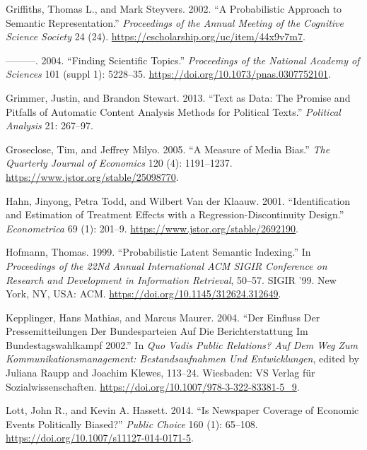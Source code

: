 \documentclass[
]{article}
\begin{document}
\leavevmode\hypertarget{ref-griffiths_probabilistic_2002}{}%
Griffiths, Thomas L., and Mark Steyvers. 2002. ``A Probabilistic
Approach to Semantic Representation.'' \emph{Proceedings of the Annual
Meeting of the Cognitive Science Society} 24 (24).
\url{https://escholarship.org/uc/item/44x9v7m7}.

\leavevmode\hypertarget{ref-griffiths_finding_2004}{}%
---------. 2004. ``Finding Scientific Topics.'' \emph{Proceedings of the
National Academy of Sciences} 101 (suppl 1): 5228--35.
\url{https://doi.org/10.1073/pnas.0307752101}.

\leavevmode\hypertarget{ref-grimmer_text_2013}{}%
Grimmer, Justin, and Brandon Stewart. 2013. ``Text as Data: The Promise
and Pitfalls of Automatic Content Analysis Methods for Political
Texts.'' \emph{Political Analysis} 21: 267--97.

\leavevmode\hypertarget{ref-groseclose_measure_2005}{}%
Groseclose, Tim, and Jeffrey Milyo. 2005. ``A Measure of Media Bias.''
\emph{The Quarterly Journal of Economics} 120 (4): 1191--1237.
\url{https://www.jstor.org/stable/25098770}.

\leavevmode\hypertarget{ref-hahn_identification_2001}{}%
Hahn, Jinyong, Petra Todd, and Wilbert Van der Klaauw. 2001.
``Identification and Estimation of Treatment Effects with a
Regression-Discontinuity Design.'' \emph{Econometrica} 69 (1): 201--9.
\url{https://www.jstor.org/stable/2692190}.

\leavevmode\hypertarget{ref-hofmann_probabilistic_1999}{}%
Hofmann, Thomas. 1999. ``Probabilistic Latent Semantic Indexing.'' In
\emph{Proceedings of the 22Nd Annual International ACM SIGIR Conference
on Research and Development in Information Retrieval}, 50--57. SIGIR
'99. New York, NY, USA: ACM.
\url{https://doi.org/10.1145/312624.312649}.

\leavevmode\hypertarget{ref-kepplinger_einfluss_2004}{}%
Kepplinger, Hans Mathias, and Marcus Maurer. 2004. ``Der Einfluss Der
Pressemitteilungen Der Bundesparteien Auf Die Berichterstattung Im
Bundestagswahlkampf 2002.'' In \emph{Quo Vadis Public Relations? Auf Dem
Weg Zum Kommunikationsmanagement: Bestandsaufnahmen Und Entwicklungen},
edited by Juliana Raupp and Joachim Klewes, 113--24. Wiesbaden: VS
Verlag für Sozialwissenschaften.
\url{https://doi.org/10.1007/978-3-322-83381-5_9}.

\leavevmode\hypertarget{ref-lott_is_2014}{}%
Lott, John R., and Kevin A. Hassett. 2014. ``Is Newspaper Coverage of
Economic Events Politically Biased?'' \emph{Public Choice} 160 (1):
65--108. \url{https://doi.org/10.1007/s11127-014-0171-5}.
\end{document}
